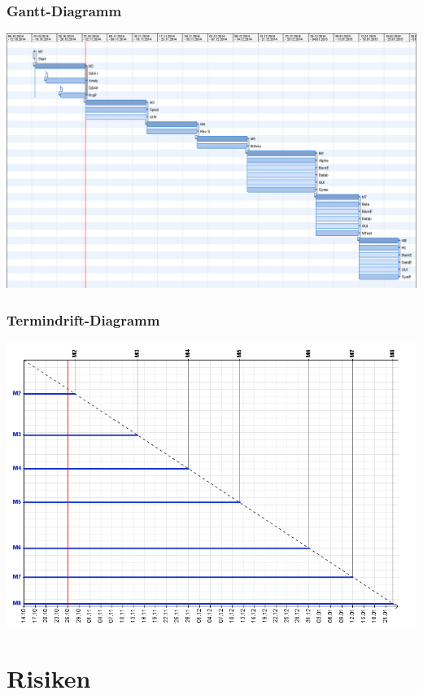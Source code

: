 \documentclass[11pt]{article}
\begin{document}
\subsubsection{Gantt-Diagramm}

\begin{center}
	\includegraphics[width=1.0\textwidth]{Tourney.png}
\end{center}

\subsubsection{Termindrift-Diagramm}

\begin{center}
	\includegraphics[width=1.1\textwidth]{TerminDriftCropped.png}
\end{center}

\newpage

\section{Risiken}
\end{document}
